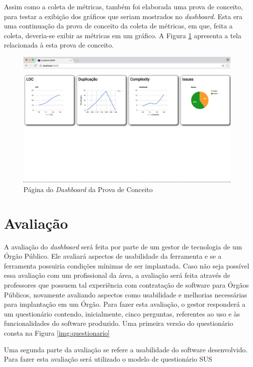 Assim como a coleta de métricas, também foi elaborada uma prova de conceito, para testar a exibição dos gráficos que seriam mostrados no \textit{dashboard}. Esta era uma continuação da prova de conceito da coleta de métricas, em que, feita a coleta, deveria-se exibir as métricas em um gráfico. A Figura \ref{img:dashboard} apresenta a tela relacionada à esta prova de conceito.

\graphicspath{{figuras/}}
\begin{figure}[H]
\centering
\includegraphics[scale=0.35]{dashboard_conceito.png}
\caption{Página do \textit{Dashboard} da Prova de Conceito}
\label{img:dashboard}
\end{figure}

\section{Avaliação}
A avaliação do \textit{dashboard} será feita por parte de um gestor de tecnologia de um Órgão Público. Ele avaliará aspectos de usabilidade da ferramenta e se a ferramenta possuiria condições mínimas de ser implantada. Caso não seja possível essa avaliação com um profissional da área, a avaliação será feita através de professores que possuem tal experiência com contratação de software para Órgãos Públicos, novamente avaliando aspectos como usabilidade e melhorias necessárias para implantação em um Órgão.
Para fazer esta avaliação, o gestor responderá a um questionário contendo, inicialmente, cinco perguntas, referentes ao uso e às funcionalidades do software produzido. Uma primeira versão do questionário consta na Figura \ref{img:questionario}

Uma segunda parte da avaliação se refere a usabilidade do software desenvolvido. Para fazer esta avaliação será utilizado o modelo de questionário SUS

